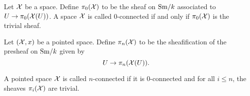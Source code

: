 \documentclass{amsart}%
\begin{document}






\begin{definition}
  Let $\mathcal{X}$ be a space. Define $\pi_0(\mathcal{X})$ to be the
  sheaf on $\mathrm{Sm}/k$ associated to $U \to \pi_0(\mathcal{X}(U))$. A space
  $\mathcal{X}$ is called $0$-connected if and only if
  $\pi_0(\mathcal{X})$ is the trivial sheaf. 

  Let $(\mathcal{X},x)$ be a pointed space. Define
  $\pi_n(\mathcal{X})$ to be the sheafification of the presheaf
  on $\mathrm{Sm}/k$ given by
  \begin{equation*}
    U \to \pi_n(\mathcal{X}(U)).
  \end{equation*}

  A pointed space $\mathcal{X}$ is called $n$-connected if it is
  $0$-connected and for all $i\leq n$, the sheaves
  $\pi_i(\mathcal{X})$ are trivial.
\end{definition}
\end{document}
